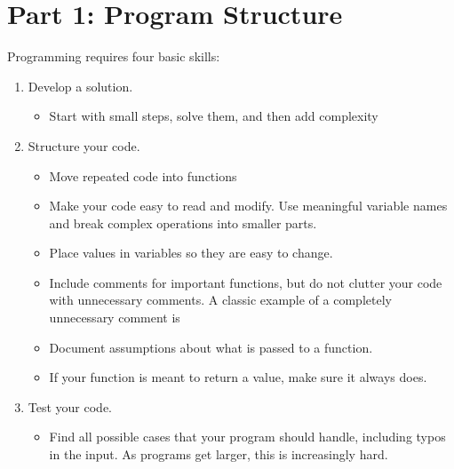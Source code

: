 \documentclass[letterpaper,10pt,english]{sphinxmanual}
\begin{document}
\section{Part 1: Program Structure}
\label{\detokenize{lecture_notes/lec11_conditionals2:part-1-program-structure}}
Programming requires four basic skills:
\begin{enumerate}
\item {} 
Develop a solution.
\begin{itemize}
\item {} 
Start with small steps, solve them, and then add complexity

\end{itemize}

\item {} 
Structure your code.
\begin{itemize}
\item {} 
Move repeated code into functions

\item {} 
Make your code easy to read and modify. Use meaningful variable names
and break complex operations into smaller parts.

\item {} 
Place values in variables so they are easy to change.

\item {} 
Include comments for important functions, but do not clutter
your code with unnecessary comments.  A classic example of a
completely unnecessary comment is

%
\begin{sphinxVerbatim}[commandchars=\\\{\}]
     
\end{sphinxVerbatim}

\item {} 
Document assumptions about what is passed to a function.

\item {} 
If your function is meant to return a value, make sure it always
does.

\end{itemize}

\item {} 
Test your code.
\begin{itemize}
\item {} 
Find all possible cases that your program should handle, including typos
in the input.  As
programs get larger, this is increasingly hard.


\end{itemize}
\end{enumerate}
\end{document}
